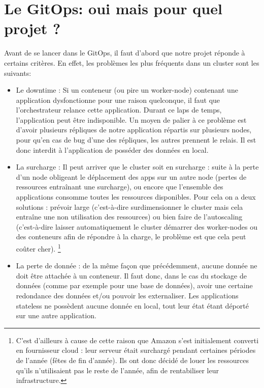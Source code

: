 \documentclass[11pt,fleqn]{book} %
\begin{document}
\section{Le GitOps: oui mais pour quel projet ?}
Avant de se lancer dans le GitOps, il faut d'abord que notre projet réponde à certains critères. En effet, les problèmes les plus fréquents dans un cluster sont les suivants: \\
\begin{itemize}
    \item Le downtime : Si un conteneur (ou pire un worker-node) contenant une application dysfonctionne pour une raison quelconque, il faut que l'orchestrateur relance cette application. Durant ce laps de temps, l'application peut être indisponible. Un moyen de palier à ce problème est d'avoir plusieurs répliques de notre application répartis sur plusieurs nodes, pour qu'en cas de bug d'une des répliques, les autres prennent le relais. Il est donc interdit à l'application de posséder des données en local. \\
    \item La surcharge : Il peut arriver que le cluster soit en surcharge : suite à la perte d'un node obligeant le déplacement des apps sur un autre node (pertes de ressources entraînant une surcharge), ou encore que l'ensemble des  applications consomme toutes les ressources disponibles. Pour cela on a deux solutions : prévoir large (c'est-à-dire surdimensionner le cluster mais cela entraîne une non utilisation des ressources) ou bien faire de l'autoscaling (c'est-à-dire laisser automatiquement le cluster démarrer des worker-nodes ou des conteneurs afin de répondre à la charge, le problème est que cela peut coûter cher). \footnote{C'est d'ailleurs à cause de cette raison que Amazon s'est initialement converti en fournisseur cloud : leur serveur était surchargé pendant certaines périodes de l'année (fêtes de fin d'année). Ils ont donc décidé de louer les ressources qu'ils n'utilisaient pas le reste de l'année, afin de rentabiliser leur infrastructure.}\\
    \item La perte de donnée : de la même façon que précédemment, aucune donnée ne doit être attachée à un conteneur. Il faut donc, dans le cas du stockage de données (comme par exemple pour une base de données), avoir une certaine redondance des données et/ou pouvoir les externaliser. Les applications stateless ne possèdent aucune donnée en local, tout leur état étant déporté sur une autre application.\\
\end{itemize}
\end{document}
